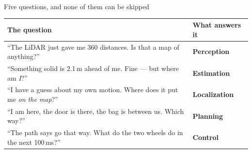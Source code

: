 \documentclass[aspectratio=169]{beamer}
\begin{document}
\begin{frame}{Five questions, and none of them can be skipped}
  \footnotesize
  \begin{center}
  \begin{tabular}{@{}p{7.6cm}p{3.0cm}@{}}
    \toprule
    \textbf{The question} & \textbf{What answers it} \\
    \midrule
    ``The LiDAR just gave me 360 distances. Is that a map of anything?''
      & \textbf{Perception} \\[0.35em]
    ``Something solid is 2.1\,m ahead of me. Fine --- but where am \emph{I}?''
      & \textbf{Estimation} \\[0.35em]
    ``I have a guess about my own motion. Where does it put me \emph{on the map}?''
      & \textbf{Localization} \\[0.35em]
    ``I am here, the door is there, the bag is between us. Which way?''
      & \textbf{Planning} \\[0.35em]
    ``The path says go that way. What do the two wheels do in the next 100\,ms?''
      & \textbf{Control} \\
    \bottomrule
  \end{tabular}
  \end{center}

  \vspace{0.7em}
\end{frame}
\end{document}
